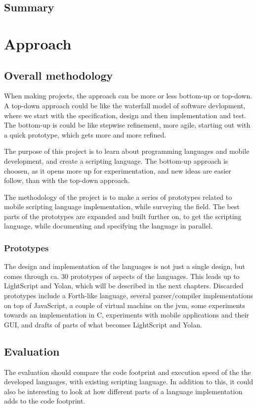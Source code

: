 \documentclass[11pt]{report}
\begin{document}
\section{Summary}
\chapter{Approach}
\label{method}
\section{Overall methodology}

When making projects, the approach can be
more or less bottom-up or top-down.
A top-down approach could be like the waterfall model\cite{waterfall} of software devlopment,
where we start with the specification, design and then implementation and test.
The bottom-up is could be like stepwise refinement\cite{stepwise-refinement}, more agile\cite{agile-manifesto, extreme-programming}, starting out with a quick prototype, which gets more and more refined.

The purpose of this project is to learn about programming languages and mobile development, and create a scripting language. 
The bottom-up approach is choosen, as it opens more up for experimentation, and new ideas are easier follow, than with the top-down approach.

The methodology of the project is to make a series of prototypes related to mobile scripting language implementation, while surveying the field. 
The best parts of the prototypes are expanded and built further on, to get the scripting language, while documenting and specifying the language in parallel.

\subsection{Prototypes}
The design and implementation of the languages is not just a single design, but comes through ca. 30 prototypes of aspects of the languages.
This leads up to LightScript and Yolan, which will be described in the next chapters.
Discarded prototypes include a Forth-like language, several parser/compiler implementations on top of JavaScript, a couple of virtual machins on the jvm, some experiments towards an implementation in C, experiments with mobile applications and their GUI, and drafts of parts of what becomes LightScript and Yolan.

\section{Evaluation}
The evaluation should compare the code footprint and execution speed of the the developed languages, with existing scripting language.
In addition to this, it could also be interesting to look at how different parts of a language implementation adds to the code footprint.
\end{document}

